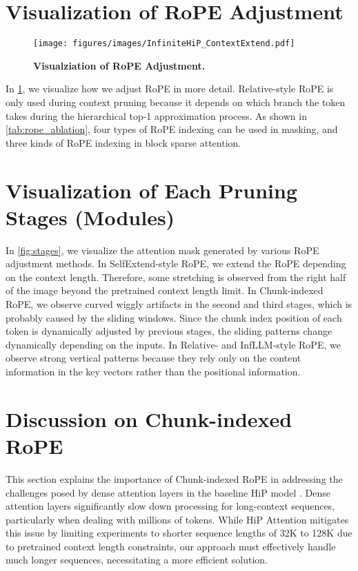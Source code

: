 \newpage
\section{Visualization of RoPE Adjustment}
\label{sec:appendix_rope}

\begin{figure}[h]
\centering
\texttt{[image: figures/images/InfiniteHiP\_ContextExtend.pdf]}
\caption{\textbf{Visualziation of RoPE Adjustment.}}
\label{fig:appendix_rope}
\end{figure}

In \cref{fig:appendix_rope}, we visualize how we adjust RoPE in more detail. Relative-style RoPE is only used during context pruning because it depends on which branch the token takes during the hierarchical top-1 approximation process. As shown in \cref{tab:rope_ablation}, four types of RoPE indexing can be used in masking, and three kinds of RoPE indexing in block sparse attention. 

\section{Visualization of Each Pruning Stages (Modules)}
\label{sec:visualization}



In \cref{fig:stages}, we visualize the attention mask generated by various RoPE adjustment methods. In SelfExtend-style RoPE, we extend the RoPE depending on the context length. 
Therefore, some stretching is observed from the right half of the image beyond the pretrained context length limit. 
In Chunk-indexed RoPE, we observe curved wiggly artifacts in the second and third stages, which is probably caused by the sliding windows. 
Since the chunk index position of each token is dynamically adjusted by previous stages, the sliding patterns change dynamically depending on the inputs. 
In Relative- and InfLLM-style RoPE, we observe strong vertical patterns because they rely only on the content information in the key vectors rather than the positional information.

\section{Discussion on Chunk-indexed RoPE}
\label{sec:visualization_streaming}

This section explains the importance of Chunk-indexed RoPE in addressing the challenges posed by dense attention layers in the baseline HiP model \citep{lee_training-free_2024}. Dense attention layers significantly slow down processing for long-context sequences, particularly when dealing with millions of tokens. While HiP Attention mitigates this issue by limiting experiments to shorter sequence lengths of 32K to 128K due to pretrained context length constraints, our approach must effectively handle much longer sequences, necessitating a more efficient solution.

